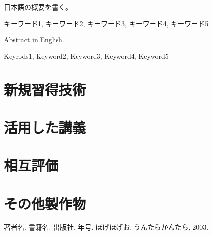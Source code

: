 \documentclass[openany,11pt,papersize,dvipdfm]{jsbook}
\begin{document}
%
\maketitle

\frontmatter

\begin{jabstract} 日本語の概要を書く。
\begin{jkeyword}
キーワード1, キーワード2, キーワード3, キーワード4, キーワード5
\end{jkeyword}
\end{jabstract}

\begin{eabstract} Abstract in English. 
\begin{ekeyword}
Keyrods1, Keyword2, Keyword3, Keyword4, Keyword5
\end{ekeyword}
\end{eabstract}

\tableofcontents%

\mainmatter%









\begin{appendix}

\chapter{新規習得技術}

\chapter{活用した講義}

\chapter{相互評価}

\chapter{その他製作物}

\end{appendix}


\begin{thebibliography}{9}
  著者名. 書籍名. 出版社,  年号.
  ほげほげお. うんたらかんたら,  2003.
\end{thebibliography}
\end{document}
